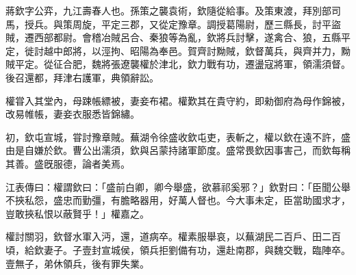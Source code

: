 
\begin{pinyinscope}
蔣欽字公弈，九江壽春人也。孫策之襲袁術，欽隨從給事。及策東渡，拜別部司馬，授兵。與策周旋，平定三郡，又從定豫章。調授葛陽尉，歷三縣長，討平盜賊，遷西部都尉。會稽冶賊呂合、秦狼等為亂，欽將兵討擊，遂禽合、狼，五縣平定，徙討越中郎將，以涇拘、昭陽為奉邑。賀齊討黝賊，欽督萬兵，與齊并力，黝賊平定。從征合肥，魏將張遼襲權於津北，欽力戰有功，遷盪寇將軍，領濡須督。後召還都，拜津右護軍，典領辭訟。

權甞入其堂內，母踈帳縹被，妻妾布裙。權歎其在貴守約，即勑御府為母作錦被，改易帷帳，妻妾衣服悉皆錦繡。

初，欽屯宣城，甞討豫章賊。蕪湖令徐盛收欽屯吏，表斬之，權以欽在遠不許，盛由是自嫌於欽。曹公出濡須，欽與呂蒙持諸軍節度。盛常畏欽因事害己，而欽每稱其善。盛旣服德，論者美焉。

江表傳曰：權謂欽曰：「盛前白卿，卿今舉盛，欲慕祁奚邪？」欽對曰：「臣聞公舉不挾私怨，盛忠而勤彊，有膽略器用，好萬人督也。今大事未定，臣當助國求才，豈敢挾私恨以蔽賢乎！」權嘉之。

權討關羽，欽督水軍入沔，還，道病卒。權素服舉哀，以蕪湖民二百戶、田二百頃，給欽妻子。子壹封宣城侯，領兵拒劉備有功，還赴南郡，與魏交戰，臨陣卒。壹無子，弟休領兵，後有罪失業。


\end{pinyinscope}
